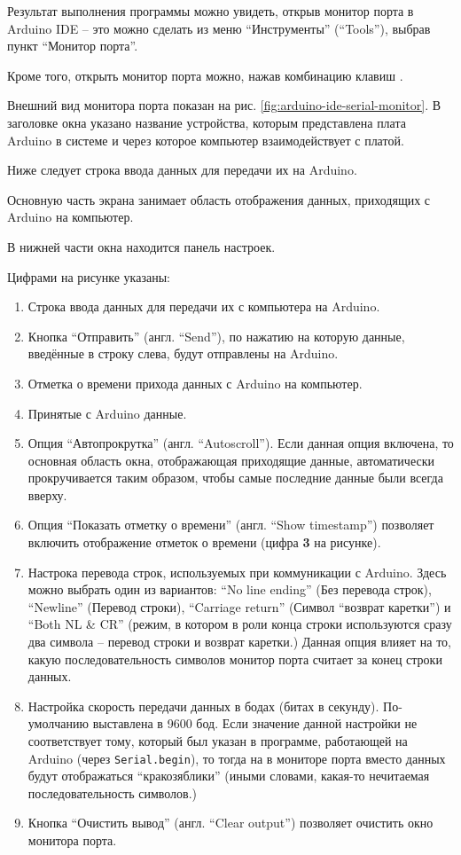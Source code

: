 \documentclass[../sparc.tex]{subfiles}
\begin{document}
Результат выполнения программы можно увидеть, открыв монитор порта в Arduino IDE
-- это можно сделать из меню ``Инструменты'' (``Tools''), выбрав пункт ``Монитор
порта''.

Кроме того, открыть монитор порта можно, нажав комбинацию клавиш .

Внешний вид монитора порта показан на рис. \ref{fig:arduino-ide-serial-monitor}.
В заголовке окна указано название устройства, которым представлена плата Arduino
в системе и через которое компьютер взаимодействует с платой.

Ниже следует строка ввода данных для передачи их на Arduino.

Основную часть экрана занимает область отображения данных, приходящих с Arduino
на компьютер.

В нижней части окна находится панель настроек.

Цифрами на рисунке указаны:
\begin{enumerate}
\item Строка ввода данных для передачи их с компьютера на Arduino.
\item Кнопка ``Отправить'' (англ. ``Send''), по нажатию на которую данные,
  введённые в строку слева, будут отправлены на Arduino.
\item Отметка о времени прихода данных с Arduino на компьютер.
\item Принятые с Arduino данные.
\item Опция ``Автопрокрутка'' (англ. ``Autoscroll'').  Если данная опция
  включена, то основная область окна, отображающая приходящие данные,
  автоматически прокручивается таким образом, чтобы самые последние данные были
  всегда вверху.
\item Опция ``Показать отметку о времени'' (англ. ``Show timestamp'') позволяет
  включить отображение отметок о времени (цифра \textbf{3} на рисунке).
\item Настрока перевода строк, используемых при коммуникации с Arduino.  Здесь
  можно выбрать один из вариантов: ``No line ending'' (Без перевода строк),
  ``Newline'' (Перевод строки), ``Carriage return'' (Символ ``возврат каретки'')
  и ``Both NL \& CR'' (режим, в котором в роли конца строки используются сразу
  два символа -- перевод строки и возврат каретки.)  Данная опция влияет на то,
  какую последовательность символов монитор порта считает за конец строки
  данных.
\item Настройка скорость передачи данных в бодах (битах в секунду).
  По-умолчанию выставлена в 9600 бод.  Если значение данной настройки не
  соответствует тому, который был указан в программе, работающей на Arduino
  (через \texttt{Serial.begin}), то тогда на в мониторе порта вместо данных
  будут отображаться ``кракозяблики'' (иными словами, какая-то нечитаемая
  последовательность символов.)
\item Кнопка ``Очистить вывод'' (англ. ``Clear output'') позволяет очистить окно
  монитора порта.
\end{enumerate}
\end{document}
